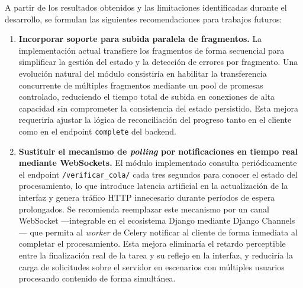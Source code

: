 \suggestions
 
A partir de los resultados obtenidos y las limitaciones identificadas durante el desarrollo, se
formulan las siguientes recomendaciones para trabajos futuros:
 
\begin{enumerate}
 
  \item \textbf{Incorporar soporte para subida paralela de fragmentos.} La implementación actual
  transfiere los fragmentos de forma secuencial para simplificar la gestión del estado y la
  detección de errores por fragmento. Una evolución natural del módulo consistiría en habilitar la
  transferencia concurrente de múltiples fragmentos mediante un pool de promesas controlado,
  reduciendo el tiempo total de subida en conexiones de alta capacidad sin comprometer la
  consistencia del estado persistido. Esta mejora requeriría ajustar la lógica de reconciliación
  del progreso tanto en el cliente como en el endpoint \texttt{complete} del backend.
 
  \item \textbf{Sustituir el mecanismo de \textit{polling} por notificaciones en tiempo real
  mediante WebSockets.} El módulo implementado consulta periódicamente el endpoint
  \texttt{/verificar\_cola/} cada tres segundos para conocer el estado del procesamiento, lo que
  introduce latencia artificial en la actualización de la interfaz y genera tráfico HTTP innecesario
  durante períodos de espera prolongados. Se recomienda reemplazar este mecanismo por un canal
  WebSocket ---integrable en el ecosistema Django mediante Django Channels--- que permita al
  \textit{worker} de Celery notificar al cliente de forma inmediata al completar el procesamiento.
  Esta mejora eliminaría el retardo perceptible entre la finalización real de la tarea y su
  reflejo en la interfaz, y reduciría la carga de solicitudes sobre el servidor en escenarios con
  múltiples usuarios procesando contenido de forma simultánea.
 
\end{enumerate}